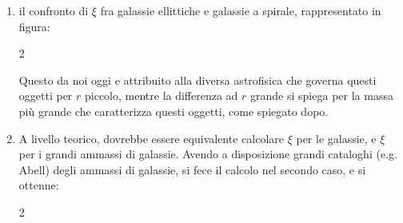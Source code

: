 \documentclass{report}
\begin{document}
\begin{enumerate}
    \item 
    il confronto di $\xi$ fra galassie ellittiche e galassie a spirale, rappresentato in figura:  

    \vspace{0.5cm}
    \begin{multicols}{2}
        


    \columnbreak
    Questo da noi oggi e attribuito alla diversa astrofisica che governa questi oggetti per $r$ piccolo, mentre la differenza ad $r$ grande si spiega per la massa più grande che caratterizza questi oggetti, come spiegato dopo.

    \end{multicols}


    \item 
    A livello teorico, dovrebbe essere equivalente calcolare $\xi$ per le galassie, e $\xi$ per i grandi ammassi di galassie. Avendo a disposizione grandi cataloghi (e.g. Abell) degli ammassi di galassie, si fece il calcolo nel secondo caso, e si ottenne: 
    \begin{multicols}{2}
\end{multicols}
\end{enumerate}
\end{document}
